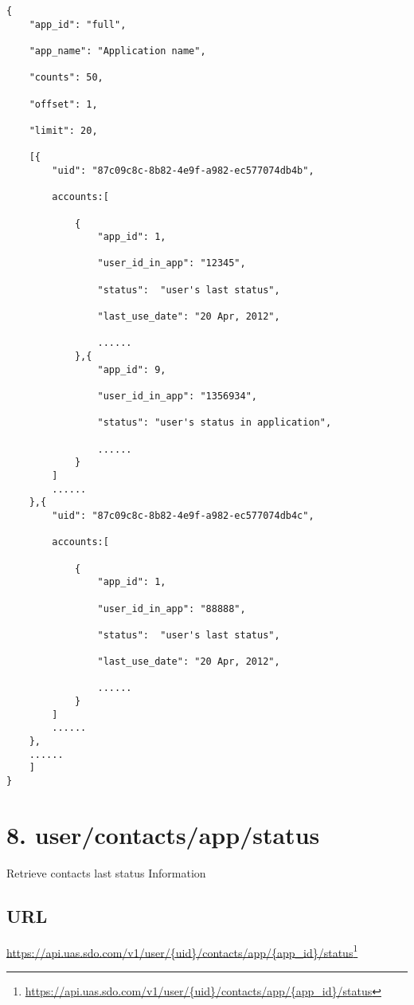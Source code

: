 \begin{verbatim}
{
    "app_id": "full",

    "app_name": "Application name",  

    "counts": 50,  

    "offset": 1,  

    "limit": 20,

    [{
        "uid": "87c09c8c-8b82-4e9f-a982-ec577074db4b",

        accounts:[

            {
                "app_id": 1,

                "user_id_in_app": "12345",

                "status":  "user's last status",

                "last_use_date": "20 Apr, 2012",

                ......
            },{
                "app_id": 9,

                "user_id_in_app": "1356934",

                "status": "user's status in application",

                ......
            }
        ]
        ......
    },{
        "uid": "87c09c8c-8b82-4e9f-a982-ec577074db4c",

        accounts:[

            {
                "app_id": 1,

                "user_id_in_app": "88888",

                "status":  "user's last status",

                "last_use_date": "20 Apr, 2012",

                ......
            }
        ]
        ......
    },
    ......
    ]
}
\end{verbatim}


\chapter{8. user\slash contacts\slash app\slash status}
\label{usercontactsappstatus}

Retrieve contacts last status Information

\section{URL}
\label{url}

\href{https://api.uas.sdo.com/v1/user/{uid}/contacts/app/{app_id}/status}{https:/\slash api.uas.sdo.com\slash v1\slash user\slash \{uid\}\slash contacts\slash app\slash \{app\_id\}\slash status}\footnote{\href{https://api.uas.sdo.com/v1/user/{uid}/contacts/app/{app_id}/status}{https:/\slash api.uas.sdo.com\slash v1\slash user\slash \{uid\}\slash contacts\slash app\slash \{app\_id\}\slash status}}

